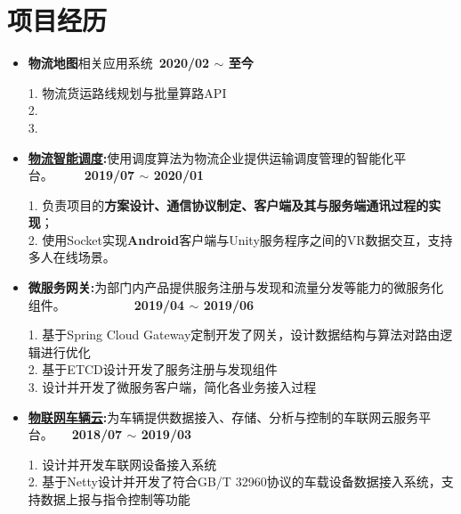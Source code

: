 \documentclass[letterpaper, UTF8, 11pt]{article}
\begin{document}
	\section*{\textbf{项目经历}}\vspace{-0.12in}
	\begin{itemize}	
		\item \textbf{物流地图}{相关应用系统}~\textbf{2020/02 $\sim$ 至今}
		
		1. 物流货运路线规划与批量算路API\\
		2. \\
		3. 
		
		\vspace{0.03in}

		\item \textbf{\href{https://lbsyun.baidu.com/solutions/scheduling}{物流智能调度}:}{使用调度算法为物流企业提供运输调度管理的智能化平台。}~~~~~\textbf{2019/07 $\sim$ 2020/01}
		
		1. 负责项目的\textbf{方案设计、通信协议制定、客户端及其与服务端通讯过程的实现}；\\
		2. 使用Socket实现\textbf{Android}客户端与Unity服务程序之间的VR数据交互，支持多人在线场景。
		
		\vspace{0.03in}

		\item \textbf{微服务网关:}{为部门内产品提供服务注册与发现和流量分发等能力的微服务化组件。}~~~~~~~~~~~\textbf{2019/04 $\sim$ 2019/06}
		
		1. 基于Spring Cloud Gateway定制开发了网关，设计数据结构与算法对路由逻辑进行优化\\
		2. 基于ETCD设计开发了服务注册与发现组件\\
		3. 设计并开发了微服务客户端，简化各业务接入过程
		
		\vspace{0.03in}
		
		\item \textbf{\href{https://cloud.baidu.com/product/dugo.html}{物联网车辆云}:}{为车辆提供数据接入、存储、分析与控制的车联网云服务平台。}~~~\textbf{2018/07 $\sim$ 2019/03}
		
		1. 设计并开发车联网设备接入系统\\
		2. 基于Netty设计并开发了符合GB/T 32960协议的车载设备数据接入系统，支持数据上报与指令控制等功能
		
		\vspace{0.03in}
		
	\end{itemize}
	\vspace{-0.32in}
\end{document}
